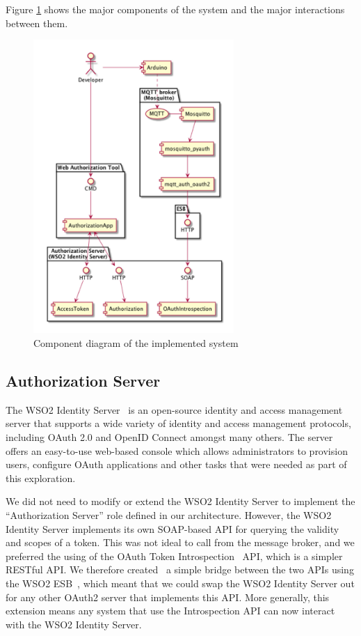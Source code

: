 \documentclass{llncs}
\begin{document}
Figure \ref{fig:component-diagram} shows 
the major components of the system and the major interactions between them. 
\begin{figure}[!t]
\centering
\includegraphics[width=3in]{component-diagram.png}
\caption{Component diagram of the implemented system}
\label{fig:component-diagram}
\end{figure}

\subsection{Authorization Server}
The WSO2 Identity Server~\cite{wso2-identity-server} is an open-source identity and access management
server that supports a wide variety of identity and access management protocols, including 
OAuth 2.0 and OpenID Connect amongst many others. The server offers an easy-to-use web-based console
which allows administrators to provision users, configure OAuth applications and other tasks 
that were needed as part of this exploration. 

We did not need to modify or extend the WSO2 Identity 
Server to implement the ``Authorization Server'' role defined in our architecture. However, the WSO2 Identity Server implements its own SOAP-based API for querying the validity and scopes of a token. This was not ideal to call from the message broker, and we preferred the using of the OAuth Token Introspection~\cite{richer2013oauth} API, which is a simpler RESTful API. We therefore created~\cite{oauth-introspection-blog} a simple bridge between the two APIs using the WSO2 ESB~\cite{wso2-esb}, which meant that we could swap the WSO2 Identity Server out for any other OAuth2 server that implements this API. More generally, this extension means any system that use the Introspection API can now interact with the WSO2 Identity Server.
\end{document}
